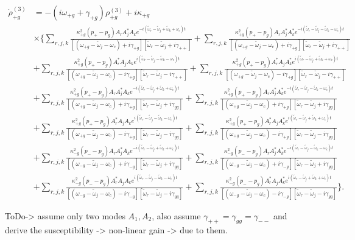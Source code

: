 \documentclass[preprint,secnumarabic,amssymb, nobibnotes, aip, prd]{revtex4-1}
\def\tw{\tilde{\omega}}
\def\tw{\tilde{\omega}}
\begin{document}
	\begin{align}
	\dot\rho_{+g}^{(3)} &= -(i\omega_{+g}+\gamma_{+g})\rho_{+g}^{(3)} +i\kappa_{+g} \nonumber \\
	& \times \Big \{ 
	\sum_{r,j,k} \frac{\kappa_{+g}^2 (p_+-p_g) A_rA_j^*A_ke^{-i(\tw_r-\tw_j+\tw_k+\omega_c)t}}{[( \omega_{+ g} - \tw_j-\omega_c) +i\gamma_{+ g}][ \tw_r-\tw_j +i\gamma_{++}]} 
	+\sum_{r,j,k} \frac{\kappa_{+g}^2 (p_+-p_g) A_rA_j^*A_k^*e^{-i(\tw_r-\tw_j-\tw_k-\omega_c)t}}{[( \omega_{+ g} - \tw_j-\omega_c) +i\gamma_{+ g}][ \tw_r-\tw_j +i\gamma_{++}]} \nonumber \\
	& + \sum_{r,j,k} \frac{\kappa_{+g}^2 (p_+-p_g) A_r^*A_jA_ke^{i(\tw_r-\tw_j-\tw_k-\omega_c)t}}{[( \omega_{+ g} - \tw_j-\omega_c) -i\gamma_{+ g}][ \tw_r-\tw_j -i\gamma_{++}]}
	  + \sum_{r,j,k} \frac{\kappa_{+g}^2 (p_+-p_g) A_r^*A_jA_k^*e^{i(\tw_r-\tw_j+\tw_k+\omega_c)t}}{[( \omega_{+ g} - \tw_j-\omega_c) -i\gamma_{+ g}][ \tw_r-\tw_j -i\gamma_{++}]}\nonumber \\	
	&+ \sum_{r,j,k} \frac{\kappa_{+g}^2 (p_+-p_g) A_rA_j^*A_ke^{-i(\tw_r-\tw_j+\tw_k+\omega_c)t}}{[( \omega_{+ g} - \tw_j-\omega_c) +i\gamma_{+ g}][ \tw_r-\tw_j +i\gamma_{gg}]} 
	 + \sum_{r,j,k} \frac{\kappa_{+g}^2 (p_+-p_g) A_rA_j^*A_k^*e^{-i(\tw_r-\tw_j-\tw_k-\omega_c)t}}{[( \omega_{+ g} - \tw_j-\omega_c) +i\gamma_{+ g}][ \tw_r-\tw_j +i\gamma_{gg}]} \nonumber \\
	&+ \sum_{r,j,k} \frac{\kappa_{+g}^2 (p_+-p_g) A_r^*A_jA_ke^{i(\tw_r-\tw_j-\tw_k-\omega_c)t}}{[( \omega_{+ g} - \tw_j-\omega_c) -i\gamma_{+ g}][ \tw_r-\tw_j -i\gamma_{gg}]} 
	 + \sum_{r,j,k} \frac{\kappa_{+g}^2 (p_+-p_g) A_r^*A_jA_k^*e^{i(\tw_r-\tw_j+\tw_k+\omega_c)t}}{[( \omega_{+ g} - \tw_j-\omega_c) -i\gamma_{+ g}][ \tw_r-\tw_j -i\gamma_{gg}]} \nonumber \\
	&+ \sum_{r,j,k} \frac{\kappa_{-g}^2 (p_--p_g) A_rA_j^*A_ke^{-i(\tw_r-\tw_j+\tw_k+\omega_c)t}}{[( \omega_{- g} - \tw_j-\omega_c) +i\gamma_{- g}][ \tw_r-\tw_j +i\gamma_{gg}]} 
	 + \sum_{r,j,k} \frac{\kappa_{-g}^2 (p_--p_g) A_rA_j^*A_k^*e^{-i(\tw_r-\tw_j-\tw_k-\omega_c)t}}{[( \omega_{- g} - \tw_j-\omega_c) +i\gamma_{- g}][ \tw_r-\tw_j +i\gamma_{gg}]} \nonumber \\
	&+ \sum_{r,j,k} \frac{\kappa_{-g}^2 (p_--p_g) A_r^*A_jA_ke^{i(\tw_r-\tw_j-\tw_k-\omega_c)t}}{[( \omega_{- g} - \tw_j-\omega_c) -i\gamma_{- g}][ \tw_r-\tw_j -i\gamma_{gg}]} 
	 + \sum_{r,j,k} \frac{\kappa_{-g}^2 (p_--p_g) A_r^*A_jA_k^*e^{i(\tw_r-\tw_j+\tw_k+\omega_c)t}}{[( \omega_{- g} - \tw_j-\omega_c) -i\gamma_{- g}][ \tw_r-\tw_j -i\gamma_{gg}]}
	\Big\}.
	\end{align}	
	
	ToDo-> assume only two modes $A_1,A_2$, also assume $\gamma_{++}=\gamma_{gg}=\gamma_{--}$ and derive the susceptibility -> non-linear gain -> due to them.  
	
	
	
	
	
\end{document}
